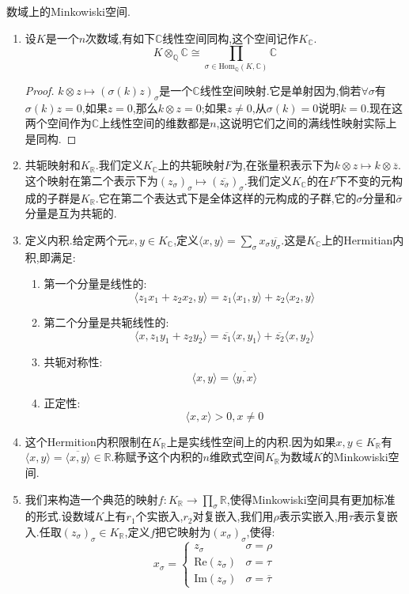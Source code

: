 数域上的Minkowiski空间.
\begin{enumerate}
	\item 设$K$是一个$n$次数域,有如下$\mathbb{C}$线性空间同构,这个空间记作$K_{\mathbb{C}}$.
	$$K\otimes_{\mathbb{Q}}\mathbb{C}\cong\prod\limits_{\sigma\in\mathrm{Hom}_{\mathbb{Q}}(K,\mathbb{C})}\mathbb{C}$$
	\begin{proof}
		
		$k\otimes z\mapsto(\sigma(k)z)_{\sigma}$是一个$\mathbb{C}$线性空间映射.它是单射因为,倘若$\forall\sigma$有$\sigma(k)z=0$,如果$z=0$,那么$k\otimes z=0$;如果$z\not=0$,从$\sigma(k)=0$说明$k=0$.现在这两个空间作为$\mathbb{C}$上线性空间的维数都是$n$,这说明它们之间的满线性映射实际上是同构.
	\end{proof}
    \item 共轭映射和$K_{\mathbb{R}}$.我们定义$K_{\mathbb{C}}$上的共轭映射$F$为,在张量积表示下为$k\otimes z\mapsto k\otimes\overline{z}$.这个映射在第二个表示下为$(z_{\sigma})_{\sigma}\mapsto(\overline{z_{\overline{\sigma}}})_{\sigma}$.我们定义$K_{\mathbb{C}}$的在$F$下不变的元构成的子群是$K_{\mathbb{R}}$.它在第二个表达式下是全体这样的元构成的子群,它的$\sigma$分量和$\overline{\sigma}$分量是互为共轭的.
    \item 定义内积.给定两个元$x,y\in K_{\mathbb{C}}$,定义$\langle x,y\rangle=\sum_{\sigma}x_{\sigma}\overline{y_{\sigma}}$.这是$K_{\mathbb{C}}$上的Hermitian内积,即满足:
    \begin{enumerate}
    	\item 第一个分量是线性的:
    	$$\langle z_1x_1+z_2x_2,y\rangle=z_1\langle x_1,y\rangle+z_2\langle x_2,y\rangle$$
    	\item 第二个分量是共轭线性的:
    	$$\langle x,z_1y_1+z_2y_2\rangle=\overline{z_1}\langle x,y_1\rangle+\overline{z_2}\langle x,y_2\rangle$$
    	\item 共轭对称性:
    	$$\langle x,y\rangle=\overline{\langle y,x\rangle}$$
    	\item 正定性:
    	$$\langle x,x\rangle>0,x\not=0$$
    \end{enumerate}
    \item 这个Hermition内积限制在$K_{\mathbb{R}}$上是实线性空间上的内积.因为如果$x,y\in K_{\mathbb{R}}$有$\langle x,y\rangle=\overline{\langle x,y\rangle}\in\mathbb{R}$.称赋予这个内积的$n$维欧式空间$K_{\mathbb{R}}$为数域$K$的Minkowiski空间.
    \item 我们来构造一个典范的映射$f:K_{\mathbb{R}}\to\prod_{\sigma}\mathbb{R}$,使得Minkowiski空间具有更加标准的形式.设数域$K$上有$r_1$个实嵌入,$r_2$对复嵌入,我们用$\rho$表示实嵌入,用$\tau$表示复嵌入.任取$(z_{\sigma})_{\sigma}\in K_{\mathbb{R}}$,定义$f$把它映射为$(x_{\sigma})_{\sigma}$,使得:
    $$x_{\sigma}=\left\{\begin{array}{cc}z_{\sigma}&\sigma=\rho\\\mathrm{Re}(z_{\sigma})&\sigma=\tau\\\mathrm{Im}(z_{\sigma})&\sigma=\overline{\tau}\end{array}\right.$$
    

\end{enumerate}
